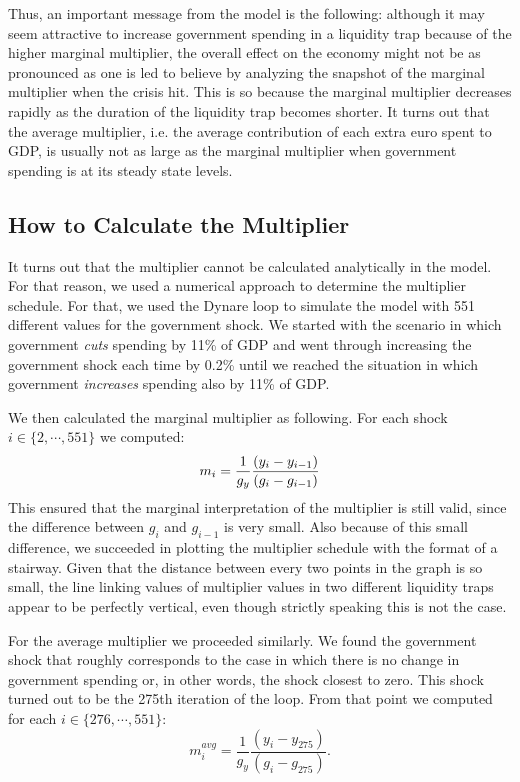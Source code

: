Thus, an important message from the model is the following: although it may seem attractive to increase government spending in a liquidity trap because of the higher marginal multiplier, the overall effect on the economy might not be as pronounced as one is led to believe by analyzing the snapshot of the marginal multiplier when the crisis hit. This is so because the marginal multiplier decreases rapidly as the duration of the liquidity trap becomes shorter. It turns out that the average multiplier, i.e. the average contribution of each extra euro spent to GDP, is usually not as large as the marginal multiplier when government spending is at its steady state levels.

\subsection*{How to Calculate the Multiplier}

It turns out that the multiplier cannot be calculated analytically in the model. For that reason, we used a numerical approach to determine the multiplier schedule. For that, we used the Dynare loop to simulate the model with 551 different values for the government shock. We started with the scenario in which government \textit{cuts} spending by 11\% of GDP and went through increasing the government shock each time by 0.2\% until we reached the situation in which government \textit{increases} spending also by 11\% of GDP.

We then calculated the marginal multiplier as following. For each shock $ i \in \{2,\cdots, 551\} $ we computed:
\begin{equation}
  m_i = \frac{1}{g_y} \frac{(y_i - y_{i-1})}{(g_i - g_{i-1})} \nonumber \vspace{0.3cm}
\end{equation}
This ensured that the marginal interpretation of the multiplier is still valid, since the difference between $ g_i $ and $ g_{i-1}$ is very small. Also because of this small difference, we succeeded in plotting the multiplier schedule with the format of a stairway. Given that the distance between every two points in the graph is so small, the line linking values of multiplier values in two different liquidity traps appear to be perfectly vertical, even though strictly speaking this is not the case.

For the average multiplier we proceeded similarly. We found the government shock that roughly corresponds to the case in which there is no change in government spending or, in other words, the shock closest to zero. This shock turned out to be the 275th iteration of the loop. From that point we computed for each $ i \in \{276,\cdots, 551\} $:
\begin{equation}
  m^{avg}_i = \frac{1}{g_y} \frac{(y_i - y_{275})}{(g_i - g_{275})}. \nonumber
\end{equation}



